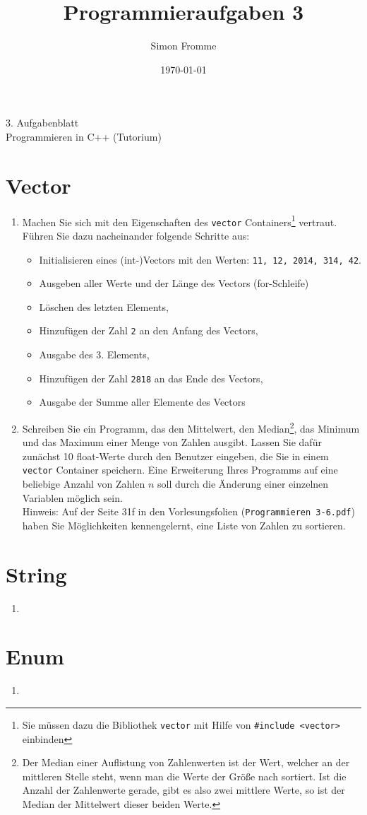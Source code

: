 \documentclass[paper=a4, fontsize=11pt, twoside]{scrartcl}
\title{Programmieraufgaben 3}
\author{Simon Fromme}
\date{\normalsize\today}
\begin{document}
\vspace*{0.75\baselineskip}
\begin{center}
  \Large 3. Aufgabenblatt \\\vspace{0.5em} \large Programmieren in C++ (Tutorium)
\end{center}

\section*{Vector}
\begin{enumerate}
\item Machen Sie sich mit den Eigenschaften des \texttt{vector} Containers\footnote{Sie müssen dazu die Bibliothek \texttt{vector} mit Hilfe von \texttt{#include <vector>} einbinden } vertraut. Führen Sie dazu nacheinander folgende Schritte aus:
  \begin{itemize}
  \item Initialisieren eines (int-)Vectors mit den Werten: \texttt{11, 12, 2014, 314, 42}.
  \item Ausgeben aller Werte und der Länge des Vectors (for-Schleife)
  \item Löschen des letzten Elements,
  \item Hinzufügen der Zahl \texttt{2} an den Anfang des Vectors,
  \item Ausgabe des 3. Elements,
  \item Hinzufügen der Zahl \texttt{2818} an das Ende des Vectors,
  \item Ausgabe der Summe aller Elemente des Vectors
  \end{itemize}

   \item Schreiben Sie ein Programm, das den Mittelwert, den Median\footnote{Der Median einer Auflistung von Zahlenwerten ist der Wert, welcher an der mittleren Stelle steht, wenn man die Werte der Größe nach sortiert. Ist die Anzahl der Zahlenwerte gerade, gibt es also zwei mittlere Werte, so ist der Median der Mittelwert dieser beiden Werte.}, das Minimum und das Maximum einer Menge von Zahlen ausgibt. Lassen Sie dafür zunächst 10 float-Werte durch den Benutzer eingeben, die Sie in einem \texttt{vector} Container speichern. Eine Erweiterung Ihres Programms auf eine beliebige Anzahl von Zahlen $n$ soll durch die Änderung einer einzelnen Variablen möglich sein. \\
Hinweis: Auf der Seite 31f in den Vorlesungsfolien (\texttt{Programmieren 3-6.pdf}) haben Sie Möglichkeiten kennengelernt, eine Liste von Zahlen zu sortieren.
\end{enumerate}

\section*{String}
\begin{enumerate}[resume]
   \item
\end{enumerate}

\section*{Enum}
\begin{enumerate}[resume]
   \item
\end{enumerate}
\end{document}
